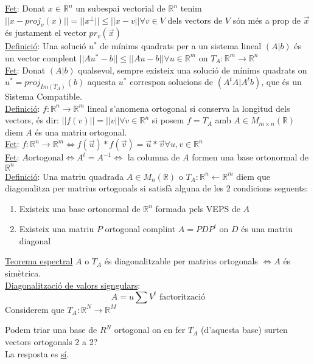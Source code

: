 \documentclass[../main.tex]{subfiles}
\begin{document}
    \underline{Fet}: Donat $x \in \mathbb{R}^n$ un subespai vectorial de $\mathbb{R}^n$ tenim $||x-proj_v(x)|| = ||x^\perp||\leq ||x-v|| \forall v \in V$ dels vectors de $V$ són més a prop de $\Vec{x}$ és justament el vector $pr_v(\Vec{x})$\\
    \underline{Definició}: Una solució $u^*$ de mínims quadrats per a un sistema lineal $(A|b)$ és un vector complent $||Au^*-b|| \leq ||Au-b|| \forall u \in \mathbb{R}^m$ on $T_A: \mathbb{R}^m \rightarrow \mathbb{R}^n$\\
    \underline{Fet}: Donat $(A|b)$ qualsevol, sempre existeix una solució de mínims quadrats on $u^* = proj_{Im(T_A)}(b)$ aquesta $u^*$ correspon solucions de $(A^tA|A^tb)$, que és un Sistema Compatible.\\
    \underline{Definició}: $f: \mathbb{R}^n \rightarrow \mathbb{R}^m$ lineal s'anomena ortogonal si conserva la longitud dels vectors, és dir: $||f(v)||=||v|| \forall v \in \mathbb{R}^n$ si posem $f=T_A$ amb $A \in M_{m\times n}(\mathbb{R})$ diem $A$ és una matriu ortogonal.\\
    \underline{Fet}: $f: \mathbb{R}^n \rightarrow \mathbb{R}^m \Leftrightarrow f(\vec{u})*f(\vec{v}) = \vec{u}*\vec{v} \forall u, v \in \mathbb{R}^n$ \\
    \underline{Fet}: $A \text{ortogonal} \Leftrightarrow A^t=A^{-1} \Leftrightarrow$ la columna de $A$ formen una base ortonormal de $\mathbb{R}^n$\\
    \underline{Definició}: Una matriu quadrada $A \in M_n(\mathbb{R})$ o $T_A: \mathbb{R}^n \leftarrow \mathbb{R}^m$ diem que diagonalitza per matrius ortogonals si satisfà alguna de les 2 condicions seguents:
    \begin{enumerate}
        \item Existeix una base ortonormal de $\mathbb{R}^n$ formada pels VEPS de $A$
        \item Existeix una matriu $P$ ortogonal complint $A=PDP^t$ on $D$ és una matriu diagonal
    \end{enumerate}
    \underline{Teorema espectral} $A$ o $T_A$ és diagonalitzable per matrius ortogonals $\Leftrightarrow A$ és simètrica.\\
    \underline{Diagonalització de valors signgulars}:
    \begin{displaymath}
        A = u \sum V^t \text{ factorització}
    \end{displaymath}
    Considerem que $T_A : \mathbb{R}^N \rightarrow \mathbb{R}^M$\\
    \begin{pregunta}
        Podem triar una base de $R^N$ ortogonal on en fer $T_A$ (d'aquesta base) surten vectors ortogonals 2 a 2?\\
        La resposta es \underline{sí}.
    \end{pregunta}
\end{document}
